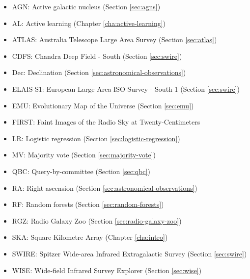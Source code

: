   \begin{itemize}
    \item AGN: Active galactic nucleus (Section \ref{sec:agns})
    \item AL: Active learning (Chapter \ref{cha:active-learning})
    \item ATLAS: Australia Telescope Large Area Survey (Section \ref{sec:atlas})
    \item CDFS: Chandra Deep Field - South (Section \ref{sec:swire})
    \item Dec: Declination (Section \ref{sec:astronomical-observations})
    \item ELAIS-S1: European Large Area ISO Survey - South 1 (Section \ref{sec:swire})
    \item EMU: Evolutionary Map of the Universe (Section \ref{sec:emu})
    \item FIRST: Faint Images of the Radio Sky at Twenty-Centimeters
    \item LR: Logistic regression (Section \ref{sec:logistic-regression})
    \item MV: Majority vote (Section \ref{sec:majority-vote})
    \item QBC: Query-by-committee (Section \ref{sec:qbc})
    \item RA: Right ascension (Section \ref{sec:astronomical-observations})
    \item RF: Random forests (Section \ref{sec:random-forests})
    \item RGZ: Radio Galaxy Zoo (Section \ref{sec:radio-galaxy-zoo})
    \item SKA: Square Kilometre Array (Chapter \ref{cha:intro})
    \item SWIRE: Spitzer Wide-area Infrared Extragalactic Survey (Section \ref{sec:swire})
    \item WISE: Wide-field Infrared Survey Explorer (Section \ref{sec:wise})
  \end{itemize}

